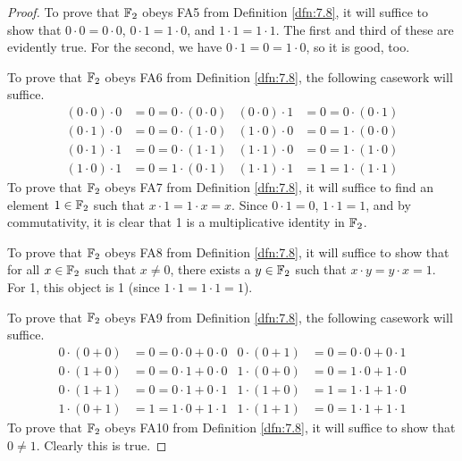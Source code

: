 \documentclass[../main.tex]{subfiles}
\begin{document}
\begin{exercise}
\begin{proof}
        To prove that $\mathbb{F}_2$ obeys FA5 from Definition \ref{dfn:7.8}, it will suffice to show that $0\cdot 0=0\cdot 0$, $0\cdot 1=1\cdot 0$, and $1\cdot 1=1\cdot 1$. The first and third of these are evidently true. For the second, we have $0\cdot 1=0=1\cdot 0$, so it is good, too.\par
        To prove that $\mathbb{F}_2$ obeys FA6 from Definition \ref{dfn:7.8}, the following casework will suffice.
        \begin{align*}
            (0\cdot 0)\cdot 0 &= 0 = 0\cdot (0\cdot 0)&
            (0\cdot 0)\cdot 1 &= 0 = 0\cdot (0\cdot 1)\\
            (0\cdot 1)\cdot 0 &= 0 = 0\cdot (1\cdot 0)&
            (1\cdot 0)\cdot 0 &= 0 = 1\cdot (0\cdot 0)\\
            (0\cdot 1)\cdot 1 &= 0 = 0\cdot (1\cdot 1)&
            (1\cdot 1)\cdot 0 &= 0 = 1\cdot (1\cdot 0)\\
            (1\cdot 0)\cdot 1 &= 0 = 1\cdot (0\cdot 1)&
            (1\cdot 1)\cdot 1 &= 1 = 1\cdot (1\cdot 1)
        \end{align*}
        To prove that $\mathbb{F}_2$ obeys FA7 from Definition \ref{dfn:7.8}, it will suffice to find an element $1\in\mathbb{F}_2$ such that $x\cdot 1=1\cdot x=x$. Since $0\cdot 1=0$, $1\cdot 1=1$, and by commutativity, it is clear that 1 is a multiplicative identity in $\mathbb{F}_2$.\par
        To prove that $\mathbb{F}_2$ obeys FA8 from Definition \ref{dfn:7.8}, it will suffice to show that for all $x\in\mathbb{F}_2$ such that $x\neq 0$, there exists a $y\in\mathbb{F}_2$ such that $x\cdot y=y\cdot x=1$. For 1, this object is 1 (since $1\cdot 1=1\cdot 1=1$).\par
        To prove that $\mathbb{F}_2$ obeys FA9 from Definition \ref{dfn:7.8}, the following casework will suffice.
        \begin{align*}
            0\cdot(0+0) &= 0 = 0\cdot 0+0\cdot 0&
            0\cdot(0+1) &= 0 = 0\cdot 0+0\cdot 1\\
            0\cdot(1+0) &= 0 = 0\cdot 1+0\cdot 0&
            1\cdot(0+0) &= 0 = 1\cdot 0+1\cdot 0\\
            0\cdot(1+1) &= 0 = 0\cdot 1+0\cdot 1&
            1\cdot(1+0) &= 1 = 1\cdot 1+1\cdot 0\\
            1\cdot(0+1) &= 1 = 1\cdot 0+1\cdot 1&
            1\cdot(1+1) &= 0 = 1\cdot 1+1\cdot 1
        \end{align*}
        To prove that $\mathbb{F}_2$ obeys FA10 from Definition \ref{dfn:7.8}, it will suffice to show that $0\neq 1$. Clearly this is true.
    \end{proof}
\end{exercise}
\end{document}
